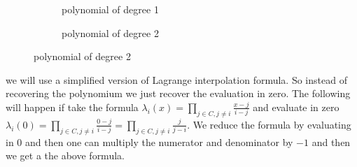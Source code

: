 \begin{figure}[H]
    \centering
    \captionsetup[subfigure]{labelformat=empty}
    \begin{subfigure}[b]{0.3\textwidth}
        \caption{polynomial of degree 1}
    \end{subfigure}
    \qquad %
    \qquad %
    \qquad %
    \qquad %
    \begin{subfigure}[b]{0.3\textwidth}
        \caption{polynomial of degree 2}
    \end{subfigure}
\end{figure}


 we will use a simplified version of Lagrange interpolation formula. So instead of recovering the polynomium we just recover the evaluation in zero. The following will happen if take the formula \begin{math} \lambda_i(x)=\prod\limits_{j\in C,j\neq i}  \frac{x-j}{i-j} \end{math} and evaluate in zero \begin{math} \lambda_i(0)=\prod\limits_{j\in C,j\neq i}  \frac{0-j}{i-j} = \prod\limits_{j\in C,j\neq i} \frac{j}{j-i} \end{math}. We reduce the formula by evaluating in $0$ and then one can multiply the numerator and denominator by $-1$ and then we get a the above formula.


